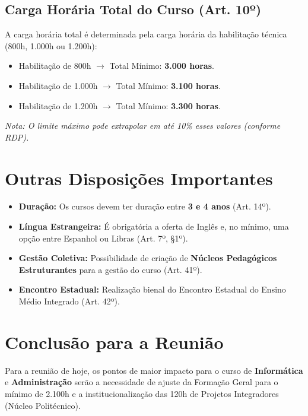 \documentclass[a4paper,12pt]{article}
\begin{document}
\subsection{Carga Horária Total do Curso (Art. 10º)}
A carga horária total é determinada pela carga horária da habilitação técnica (800h, 1.000h ou 1.200h):
\begin{itemize}
    \item Habilitação de 800h $\rightarrow$ Total Mínimo: \textbf{3.000 horas}.
    \item Habilitação de 1.000h $\rightarrow$ Total Mínimo: \textbf{3.100 horas}.
    \item Habilitação de 1.200h $\rightarrow$ Total Mínimo: \textbf{3.300 horas}.
\end{itemize}
\textit{Nota: O limite máximo pode extrapolar em até 10\% esses valores (conforme RDP).}

\section{Outras Disposições Importantes}
\begin{itemize}
    \item \textbf{Duração:} Os cursos devem ter duração entre \textbf{3 e 4 anos} (Art. 14º).
    \item \textbf{Língua Estrangeira:} É obrigatória a oferta de Inglês e, no mínimo, uma opção entre Espanhol ou Libras (Art. 7º, §1º).
    \item \textbf{Gestão Coletiva:} Possibilidade de criação de \textbf{Núcleos Pedagógicos Estruturantes} para a gestão do curso (Art. 41º).
    \item \textbf{Encontro Estadual:} Realização bienal do Encontro Estadual do Ensino Médio Integrado (Art. 42º).
\end{itemize}

\section{Conclusão para a Reunião}
Para a reunião de hoje, os pontos de maior impacto para o curso de \textbf{Informática} e \textbf{Administração} serão a necessidade de ajuste da Formação Geral para o mínimo de 2.100h e a institucionalização das 120h de Projetos Integradores (Núcleo Politécnico).
\end{document}
